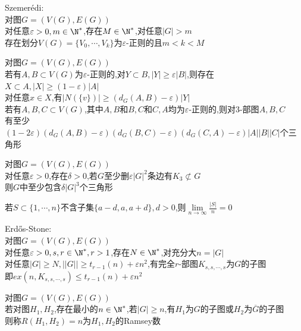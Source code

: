 \begin{dingli}
Szemerédi:\\
对图$G=(V(G),E(G))$\\
对任意$\varepsilon>0, m\in \N^*$,存在$M\in \N^*$,对任意$|G|>m$\\
存在划分$V(G)=\{V_0,\cdots,V_k\}$为$\varepsilon$-正则的且$m<k<M$
\end{dingli}

\begin{dingli}
对图$G=(V(G),E(G))$\\
若有$A,B\subset V(G)$为$\varepsilon$-正则的,对$Y\subset B, |Y|\geq \varepsilon|B|$,则存在$X\subset A,|X|\geq (1-\varepsilon)|A|$\\
对任意$x\in X$,有$|N(\{v\})|\geq (d_{G}(A,B)-\varepsilon)|Y|$\\
若有$A,B,C\subset V(G)$,其中$A,B$和$B,C$和$C,A$均为$\varepsilon$-正则的,则对$3$-部图$A,B,C$\\
有至少$(1-2\varepsilon)(d_{G}(A,B)-\varepsilon)(d_{G}(B,C)-\varepsilon)(d_{G}(C,A)-\varepsilon)|A||B||C|$个三角形
\end{dingli}

\begin{dingli}
对图$G=(V(G),E(G))$\\
对任意$\varepsilon>0$,存在$\delta>0$,若$G$至少删$\varepsilon|G|^2$条边有$K_3\not\subset G$\\
则$G$中至少包含$\delta|G|^3$个三角形
\end{dingli}

\begin{zhu}
若$S\subset\{1,\cdots,n\}$不含子集$\{a-d,a,a+d\},d>0$,则$\lim\limits_{n\to\infty}\frac{|S|}{n}=0$
\end{zhu}

\begin{dingli}
Erd\H{o}s-Stone:\\
对图$G=(V(G),E(G))$\\
对任意$\varepsilon>0,s,r\in \N^*,r>1$,存在$N\in \N^*$,对充分大$n=|G|$\\
对任意$|G|\geq N,||G||\geq t_{r-1}(n)+\varepsilon n^2$,有完全$r$-部图$K_{s,s,\cdots,s}$为$G$的子图\\
即$ex(n,K_{s,s,\cdots,s})\leq t_{r-1}(n)+\varepsilon n^2$
\end{dingli}

\begin{dingyi}
对图$G=(V(G),E(G))$\\
若对图$H_1,H_2$,存在最小的$n\in\N^*$,若$|G|\geq n$,有$H_1$为$G$的子图或$H_2$为$\overline{G}$的子图\\
则称$R(H_1,H_2)=n$为$H_1,H_2$的Ramsey数
\end{dingyi}


